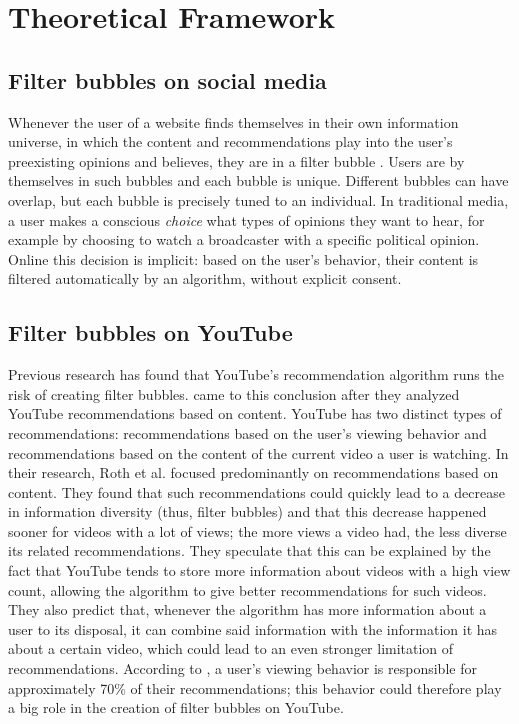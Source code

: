 \documentclass[../main.tex]{subfiles}
\begin{document}
\section{Theoretical Framework}
\subsection{Filter bubbles on social media}
Whenever the user of a website finds themselves in their own information universe, in which the content
and recommendations play into the user's preexisting opinions and believes, they are in a filter bubble
\citep{pariser2011filter}. Users are by themselves in such bubbles and each bubble is unique. Different
bubbles can have overlap, but each bubble is precisely tuned to an individual. In traditional media, a
user makes a conscious \textit{choice} what types of opinions they want to hear, for example by choosing
to watch a broadcaster with a specific political opinion. Online this decision is implicit: based on the
user's behavior, their content is filtered automatically by an algorithm, without explicit consent. 

\subsection{Filter bubbles on YouTube}
Previous research has found that YouTube's recommendation algorithm runs the risk of creating filter
bubbles. \citet{roth2020tubes} came to this conclusion after they analyzed YouTube recommendations based
on content. YouTube has two distinct types of recommendations: recommendations based on the user's
viewing behavior and recommendations based on the content of the current video a user is watching. In
their research, Roth et al. focused predominantly on recommendations based on content. They found that
such recommendations could quickly lead to a decrease in information diversity (thus, filter bubbles)
and that this decrease happened sooner for videos with a lot of views; the more views a video had, the
less diverse its related recommendations. They speculate that this can be explained by the fact that
YouTube tends to store more information about videos with a high view count, allowing the algorithm to
give better recommendations for such videos. They also predict that, whenever the algorithm has more
information about a user to its disposal, it can combine said information with the information it has
about a certain video, which could lead to an even stronger limitation of recommendations. According to
\citet{ledwich2020algorithmic}, a user's viewing behavior is responsible for approximately 70\% of their
recommendations; this behavior could therefore play a big role in the creation of filter bubbles on
YouTube. 
\end{document}
